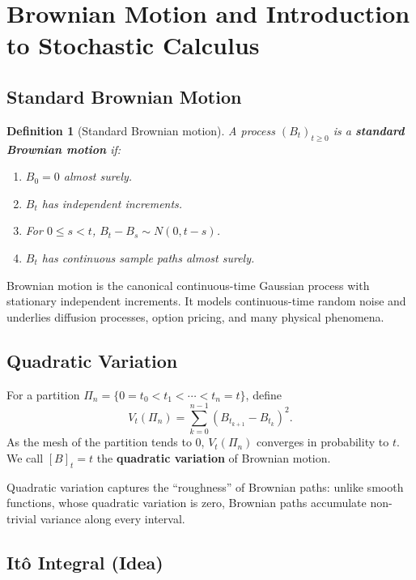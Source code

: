 \documentclass[11pt,a4paper]{article}
\newtheorem{definition}{Definition}[section]
\numberwithin{equation}{section}
\begin{document}
\newpage

\section{Brownian Motion and Introduction to Stochastic Calculus}
\label{sec:brownian}

\subsection{Standard Brownian Motion}

\begin{definition}[Standard Brownian motion]
A process $(B_t)_{t\ge 0}$ is a \textbf{standard Brownian motion} if:
\begin{enumerate}[label=(\roman*)]
    \item $B_0=0$ almost surely.
    \item $B_t$ has independent increments.
    \item For $0\le s < t$, $B_t - B_s \sim N(0,t-s)$.
    \item $B_t$ has continuous sample paths almost surely.
\end{enumerate}
\end{definition}

Brownian motion is the canonical continuous-time Gaussian process with stationary independent increments. 
It models continuous-time random noise and underlies diffusion processes, option pricing, and many physical phenomena.

\subsection{Quadratic Variation}

For a partition $\Pi_n = \{0=t_0 < t_1 < \cdots < t_n = t\}$, define
\[
V_t(\Pi_n) = \sum_{k=0}^{n-1} (B_{t_{k+1}} - B_{t_k})^2.
\]
As the mesh of the partition tends to 0, $V_t(\Pi_n)$ converges in probability to $t$. 
We call $[B]_t = t$ the \textbf{quadratic variation} of Brownian motion.

Quadratic variation captures the ``roughness'' of Brownian paths: unlike smooth functions, whose quadratic variation is zero, Brownian paths accumulate non-trivial variance along every interval.

\subsection{It\^o Integral (Idea)}
\end{document}

